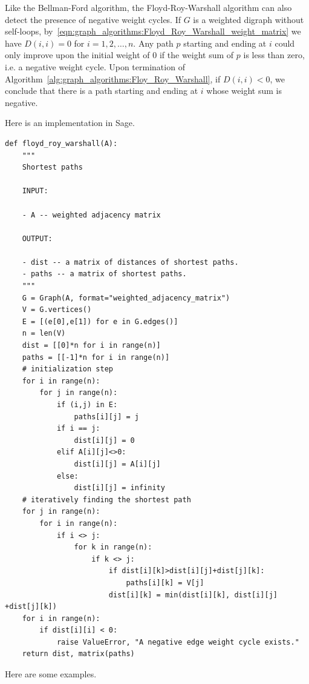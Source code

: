 Like the Bellman-Ford algorithm, the
Floyd-Roy-Warshall algorithm can
also detect the presence of negative weight
cycles. If $G$ is a weighted digraph without
self-loops,
by~\eqref{eqn:graph_algorithms:Floyd_Roy_Warshall_weight_matrix} we
have $D(i,i) = 0$ for $i = 1, 2, \dots, n$. Any path $p$ starting and
ending at $i$ could only improve upon the initial weight of $0$ if the
weight sum of $p$ is less than zero, i.e. a negative weight
cycle. Upon termination of
Algorithm~\ref{alg:graph_algorithms:Floy_Roy_Warshall}, if $D(i,i) <
0$, we conclude that there is a path starting and ending at $i$ whose
weight sum is negative.

Here is an implementation in Sage.
\begin{lstlisting}
def floyd_roy_warshall(A):
    """
    Shortest paths

    INPUT:

    - A -- weighted adjacency matrix

    OUTPUT:

    - dist -- a matrix of distances of shortest paths.
    - paths -- a matrix of shortest paths.
    """
    G = Graph(A, format="weighted_adjacency_matrix")
    V = G.vertices()
    E = [(e[0],e[1]) for e in G.edges()]
    n = len(V)
    dist = [[0]*n for i in range(n)]
    paths = [[-1]*n for i in range(n)]
    # initialization step
    for i in range(n):
        for j in range(n):
            if (i,j) in E:
                paths[i][j] = j
            if i == j:
                dist[i][j] = 0
            elif A[i][j]<>0:
                dist[i][j] = A[i][j]
            else:
                dist[i][j] = infinity
    # iteratively finding the shortest path
    for j in range(n):
        for i in range(n):
            if i <> j:
                for k in range(n):
                    if k <> j:
                        if dist[i][k]>dist[i][j]+dist[j][k]:
                            paths[i][k] = V[j]
                        dist[i][k] = min(dist[i][k], dist[i][j] +dist[j][k])
    for i in range(n):
        if dist[i][i] < 0:
            raise ValueError, "A negative edge weight cycle exists."
    return dist, matrix(paths)
\end{lstlisting}

Here are some examples.

%
%
%
%

